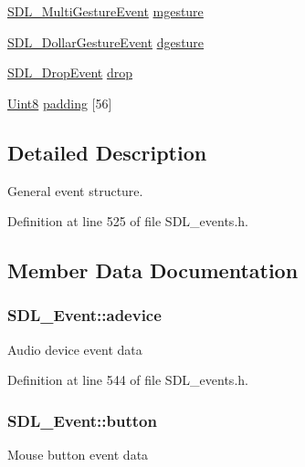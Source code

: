 \begin{DoxyCompactItemize}
\hyperlink{struct_s_d_l___multi_gesture_event}{S\-D\-L\-\_\-\-Multi\-Gesture\-Event} \hyperlink{union_s_d_l___event_ac19b3c6a6b5181a51eb4fbe2cbe726a9}{mgesture}
\item 
\hyperlink{struct_s_d_l___dollar_gesture_event}{S\-D\-L\-\_\-\-Dollar\-Gesture\-Event} \hyperlink{union_s_d_l___event_a4481167b9f8549aeb254e97ca812e74d}{dgesture}
\item 
\hyperlink{struct_s_d_l___drop_event}{S\-D\-L\-\_\-\-Drop\-Event} \hyperlink{union_s_d_l___event_acff77bccbca65abbb876360a3f5209c9}{drop}
\item 
\hyperlink{_s_d_l__stdinc_8h_a2944638813a090aa23e62f4da842c3e2}{Uint8} \hyperlink{union_s_d_l___event_aabb599570edfa54aad6255c1f24f2ad2}{padding} \mbox{[}56\mbox{]}
\end{DoxyCompactItemize}


\subsection{Detailed Description}
General event structure. 

Definition at line 525 of file S\-D\-L\-\_\-events.\-h.



\subsection{Member Data Documentation}
\hypertarget{union_s_d_l___event_a111e01fcac4fd8e251a6058ff9f17e72}{
\subsubsection[{adevice}]{ S\-D\-L\-\_\-\-Event\-::adevice}}\label{union_s_d_l___event_a111e01fcac4fd8e251a6058ff9f17e72}
Audio device event data 

Definition at line 544 of file S\-D\-L\-\_\-events.\-h.

\hypertarget{union_s_d_l___event_ab6da2fa2687e5f849f270adecc64785f}{
\subsubsection[{button}]{ S\-D\-L\-\_\-\-Event\-::button}}\label{union_s_d_l___event_ab6da2fa2687e5f849f270adecc64785f}
Mouse button event data 

